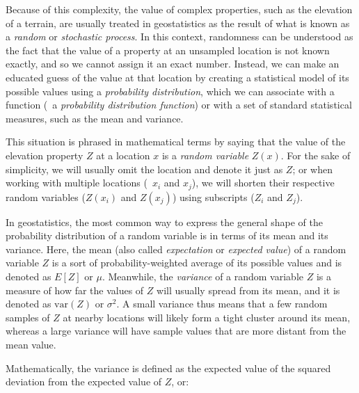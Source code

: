 Because of this complexity, the value of complex properties, such as the elevation of a terrain, are usually treated in geostatistics as the result of what is known as a \emph{random} or \emph{stochastic process}.
In this context, randomness can be understood as the fact that the value of a property at an unsampled location is not known exactly, and so we cannot assign it an exact number.
Instead, we can make an educated guess of the value at that location by creating a statistical model of its possible values using a \emph{probability distribution}, which we can associate with a function (\ie\ a \emph{probability distribution function}) or with a set of standard statistical measures, such as the mean and variance.

This situation is phrased in mathematical terms by saying that the value of the elevation property \(Z\) at a location \(x\) is a \emph{random variable} \(Z(x)\).
For the sake of simplicity, we will usually omit the location and denote it just as \(Z\); or when working with multiple locations (\eg\ \(x_i\) and \(x_j\)), we will shorten their respective random variables (\(Z(x_i)\) and \(Z(x_j)\)) using subscripts (\(Z_i\) and \(Z_j\)).

In geostatistics, the most common way to express the general shape of the probability distribution of a random variable is in terms of its mean and its variance.
Here, the mean (also called \emph{expectation} or \emph{expected value}) of a random variable \(Z\) is a sort of probability-weighted average of its possible values and is denoted as \(E[Z]\) or \(\mu\).
Meanwhile, the \emph{variance} of a random variable \(Z\) is a measure of how far the values of \(Z\) will usually spread from its mean, and it is denoted as \(\mathrm{var}(Z)\) or \(\sigma^2\).
A small variance thus means that a few random samples of \(Z\) at nearby locations will likely form a tight cluster around its mean, whereas a large variance will have sample values that are more distant from the mean value.

Mathematically, the variance is defined as the expected value of the squared deviation from the expected value of \(Z\), or:

